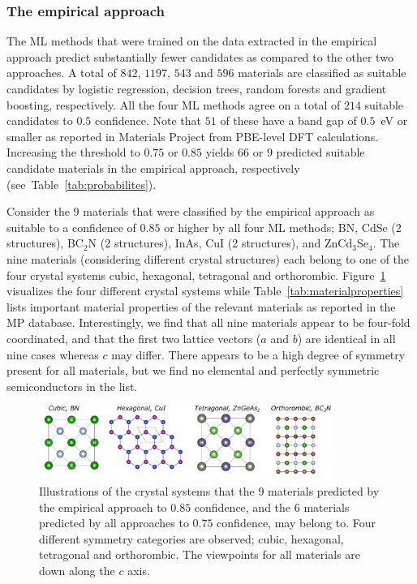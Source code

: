 \documentclass[superscriptaddress,unsortedaddress,
 amsmath,amssymb,
 aps,
]{revtex4-2}
\begin{document}
\subsubsection*{The empirical approach}
The ML methods that were trained on the data extracted in the empirical approach predict substantially fewer candidates as compared to the other two approaches. 
A total of $842$, $1197$, $543$ and $596$ materials are classified as suitable candidates by logistic regression, decision trees, random forests and gradient boosting, respectively. All the four ML methods agree on a total of $214$ suitable candidates to $0.5$ confidence.   
Note that $51$ of these have a band gap of $0.5$~eV or smaller as reported in Materials Project from PBE-level DFT calculations. Increasing the threshold to $0.75$ or $0.85$ yields $66$ or $9$ predicted suitable candidate materials in the empirical approach, respectively (see~Table~\ref{tab:probabilites}). 

Consider the $9$ materials that were classified by the empirical approach as suitable to a confidence of $0.85$ or higher by all four ML methods; BN, CdSe (2 structures), BC$_2$N (2 structures), InAs, CuI (2 structures), and ZnCd$_3$Se$_4$. 
The nine materials (considering different crystal structures) each belong to one of the four crystal systems cubic, hexagonal, tetragonal and orthorombic. Figure~\ref{fig:crystalsystems} visualizes the four different crystal systems while Table~\ref{tab:materialproperties} lists important material properties of the relevant materials as reported in the MP database.  Interestingly, we find that all nine materials appear to be four-fold coordinated, and that the first two lattice vectors ($a$ and $b$) are identical in all nine cases whereas $c$ may differ.  
There appears to be a high degree of symmetry present for all materials, but we find no elemental and perfectly symmetric semiconductors in the list. 

\begin{figure}[t]
    \centering
    \includegraphics[width=0.85\textwidth]{figures/vesta-images/fig6-all.png}
    \caption{Illustrations of the crystal systems that the $9$ materials predicted by the empirical approach to $0.85$ confidence, and the $6$ materials predicted by all approaches to $0.75$ confidence, may belong to. Four different symmetry categories are observed; cubic, hexagonal, tetragonal and orthorombic. The viewpoints for all materials are down along the $c$ axis.   }
    \label{fig:crystalsystems}
\end{figure}
\end{document}
